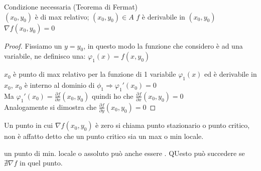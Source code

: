 \documentclass[a4paper, oneside]{article}
\begin{document}
        \begin{proposition}
            Condizione necessaria (Teorema di Fermat)\\
             $(x_0,y_0)$ è di max relativo; $(x_0,y_0) \in A$  $f$ è derivabile in $(x_0,y_0)$\\ 
             $\nabla f(x_0,y_0) = 0$
        \end{proposition}

        \begin{proof}
            Fissiamo un $y = y_0$, in questo modo la funzione che considero è ad una variabile, ne definisco una: $\varphi_1 (x) = f(x, y_0)$
            \begin{center}
            \end{center}\noindent
            $x_0$ è punto di max relativo per la funzione di 1 variabile $\varphi_1(x)$ ed è derivabile in $x_0$, $x_0$ è interno al dominio di $\phi_1 \Rightarrow \varphi_1'(x_0) = 0$\\
            Ma $\varphi_1'(x_0) = \frac{\partial f}{\partial x}(x_0,y_0)$ quindi ho che $\frac{\partial f}{\partial x}(x_0,y_0) = 0$\\
            Analogamente si dimostra che $\frac{\partial f}{\partial y} (x_0,y_0) = 0$
        \end{proof}


        \begin{proposition}
            Un punto in cui $\nabla f(x_0,y_0)$ è zero si chiama punto stazionario o punto critico, non è affatto detto che un punto critico sia un max o min locale.
        \end{proposition}


        \begin{observation}
            un punto di min. locale o assoluto può anche essere . QUesto può succedere se $\nexists \nabla f$ in quel punto.\\
        \end{observation}
\end{document}
